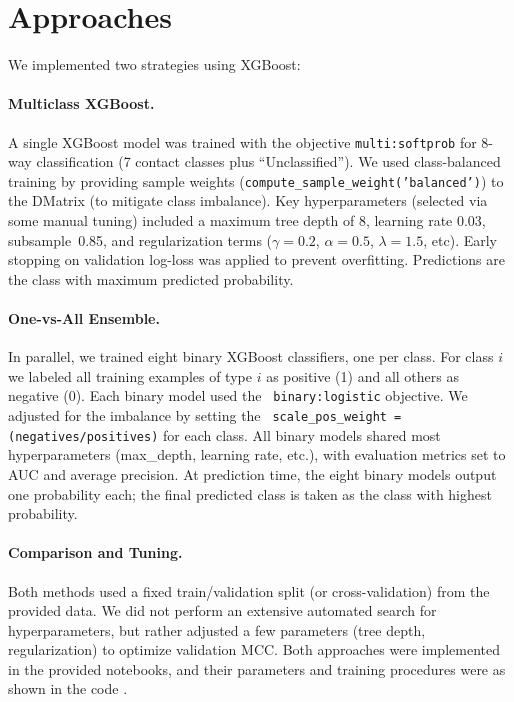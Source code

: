 \documentclass[10pt,twocolumn,letterpaper]{article}
\begin{document}
\section{Approaches}
We implemented two strategies using XGBoost:

\paragraph{Multiclass XGBoost.}  A single XGBoost model was trained with the objective \texttt{multi:softprob} for 8-way classification (7 contact classes plus “Unclassified”).  
We used class-balanced training by providing sample weights (\texttt{compute\_sample\_weight('balanced')}) to the DMatrix (to mitigate class imbalance).  Key hyperparameters (selected via some manual tuning) included a maximum tree depth of 8, learning rate 0.03, subsample~0.85, and regularization terms ($\gamma=0.2$, $\alpha=0.5$, $\lambda=1.5$, etc).  
Early stopping on validation log-loss was applied to prevent overfitting.  Predictions are the class with maximum predicted probability.

\paragraph{One-vs-All Ensemble.}  In parallel, we trained eight binary XGBoost classifiers, one per class.  For class $i$ we labeled all training examples of type $i$ as positive (1) and all others as negative (0).  Each binary model used the \texttt{ binary:logistic} objective.  We adjusted for the imbalance by setting the \texttt{ scale\_pos\_weight = (negatives/positives)} for each class.  All binary models shared most hyperparameters (max\_depth, learning rate, etc.), with evaluation metrics set to AUC and average precision.  At prediction time, the eight binary models output one probability each; the final predicted class is taken as the class with highest probability.

\paragraph{Comparison and Tuning.}  Both methods used a fixed train/validation split (or cross-validation) from the provided data.  We did not perform an extensive automated search for hyperparameters, but rather adjusted a few parameters (tree depth, regularization) to optimize validation MCC.  Both approaches were implemented in the provided notebooks, and their parameters and training procedures were as shown in the code    .
\end{document}
